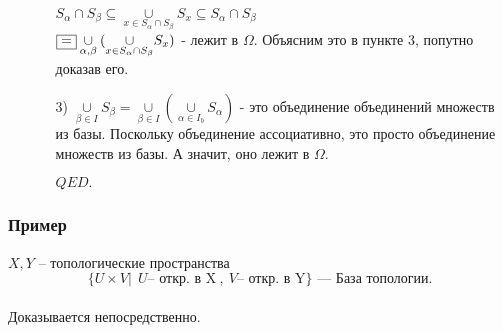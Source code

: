 \begin{enumerate}
\begin{enumerate}
\\ $S_{\alpha}\cap S_{\beta}\subseteq\underset{x\in S_{\alpha}\cap S_{\beta}}{\cup}S_{x}\subseteq S_{\alpha}\cap S_{\beta}$
\\ $\fbox{=}\underset{\alpha,\beta}{\cup}(\underset{x\in S_{\alpha}\cap S_{\beta}}{\cup}S_{x})$ - лежит в $\Omega$. Объясним это в пункте 3, попутно доказав его.
\item[3)] $\underset{\beta\in I}{\cup}S_{\beta} = \underset{\beta\in I}{\cup}(\underset{\alpha\in I_{b}}{\cup}S_{\alpha})$ - это объединение объединений множеств из базы. Поскольку объединение ассоциативно, это просто объединение множеств из базы. А значит, оно лежит в $\Omega$.
\begin{flushright}
$QED.$
\end{flushright}
\end{enumerate}
\end{enumerate}
\subsubsection{Пример}
$X, Y$ -- топологические пространства
\\ $$\lbrace U\times V |~~ U \text{-- откр. в X}~,~ V \text{-- откр. в Y}\rbrace \text{ --- База топологии.}$$
\\Доказывается непосредственно.
